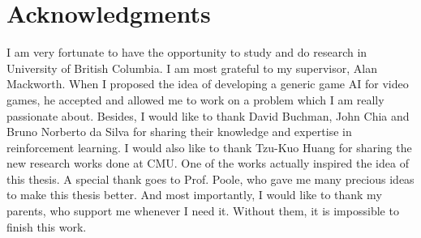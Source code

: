 
\chapter{Acknowledgments}

I am very fortunate to have the opportunity to study and do research in
University of British Columbia. I am most grateful to my supervisor, Alan Mackworth.
When I proposed the idea of developing a generic game AI for video games, he
accepted and allowed me to work on a problem which I am really passionate about.
Besides, I would like to thank David Buchman, John Chia and Bruno Norberto da Silva
for sharing their knowledge and expertise in reinforcement learning.
I would also like to thank Tzu-Kuo Huang for sharing
the new research works done at CMU. One of the works actually inspired
the idea of this thesis.
A special thank goes to Prof. Poole, who gave me many precious ideas to make this
thesis better.
And most importantly, I would like to thank my parents, who support
me whenever I need it. Without them, it is impossible to finish this work.




